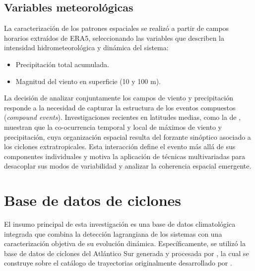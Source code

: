 \subsection{Variables meteorológicas}\label{subsec:variables}

La caracterización de los patrones espaciales se realizó a partir de campos horarios extraídos de ERA5, seleccionando las variables que describen la intensidad hidrometeorológica y dinámica del sistema:
\begin{itemize}
    \item Precipitación total acumulada.
    \item Magnitud del viento en superficie (10 y 100 m).
\end{itemize}

La decisión de analizar conjuntamente los campos de viento y precipitación responde a la necesidad de capturar la estructura de los eventos compuestos (\textit{compound events}). Investigaciones recientes en latitudes medias, como la de \citet{chen2025characteristics}, muestran que la co-ocurrencia temporal y local de máximos de viento y precipitación, cuya organización espacial resulta del forzante sinóptico asociado a los ciclones extratropicales. Esta interacción define el evento más allá de sus componentes individuales y motiva la aplicación de técnicas multivariadas para desacoplar sus modos de variabilidad y analizar la coherencia espacial emergente.


\section{Base de datos de ciclones}\label{sec:bd_ciclones_fases}

El insumo principal de esta investigación es una base de datos climatológica integrada que combina la detección lagrangiana de los sistemas con una caracterización objetiva de su evolución dinámica. Específicamente, se utilizó la base de datos de ciclones del Atlántico Sur generada y procesada por \citet{coutodesouza2024new}, la cual se construye sobre el catálogo de trayectorias originalmente desarrollado por \citet{gramcianinov2019properties}.

